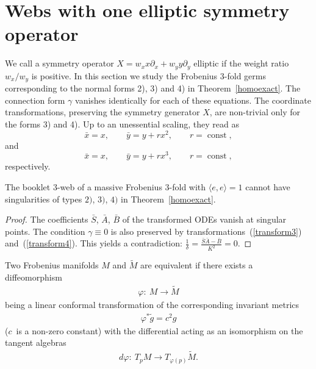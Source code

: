 \documentclass[pdftex]{sigma}
\begin{document}
\section{Webs with one elliptic symmetry operator}
We call a symmetry operator $X=w_xx\partial_x+w_yy\partial_y$ elliptic if the weight ratio $w_x/w_y$ is positive. In this section we study the Frobenius $3$-fold germs corresponding to the normal forms 2), 3) and 4) in Theorem~\ref{homoexact}. The connection form $\gamma$ vanishes identically for each of these equations.
The coordinate transformations, preserving the symmetry generator $X$, are non-trivial only for the forms 3) and 4). Up to an unessential scaling, they read as
\begin{equation}\label{transform3}
\bar{x}=x, \qquad \bar{y}=y+rx^2,\qquad r=\operatorname{const},
\end{equation}
and
\begin{equation}\label{transform4}
\bar{x}=x, \qquad \bar{y}=y+rx^3,\qquad r=\operatorname{const},
\end{equation}
respectively.
\begin{proposition}
The booklet $3$-web of a massive Frobenius $3$-fold with $\langle e,e\rangle =1$ cannot have singularities of types
$2)$, $3)$, $4)$ in Theorem~{\rm\ref{homoexact}}.
\end{proposition}
\begin{proof}
The coef\/f\/icients $\bar{S}$, $\bar{A}$, $\bar{B}$ of the transformed ODEs vanish at singular points.
The condition $\gamma \equiv 0$ is also preserved by transformations~(\ref{transform3}) and~(\ref{transform4}).
This yields a contradiction: $\frac{1}{\delta}=\frac{\bar{S}\bar{A}-\bar{B}}{K^2}=0$.
\end{proof}
\begin{definition}[\cite{Df}]
Two Frobenius manifolds $M$ and $\tilde{M}$ are equivalent if there exists a dif\/feo\-mor\-phism
\begin{gather*}
 \varphi: \  M \to \tilde{M}
\end{gather*}
being a linear conformal transformation of the corresponding invariant metrics
\begin{gather*}
\varphi ^*\tilde{g}=c^2g
\end{gather*}
($c$~is a non-zero constant) with the dif\/ferential acting as an isomorphism on the tangent algebras
\begin{gather*}
d\varphi: \  T_pM \to T_{\varphi (p)}\tilde{M}.
\end{gather*}
\end{definition}
\end{document}

